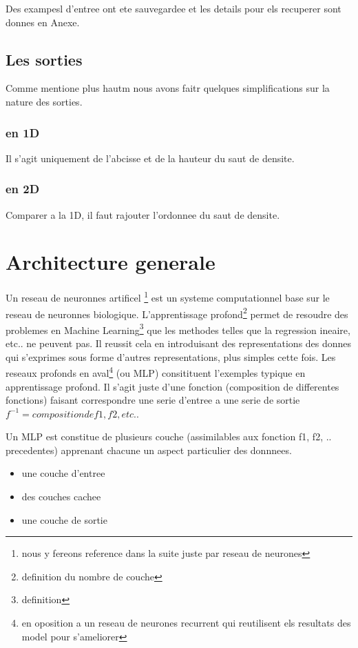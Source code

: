 Des exampesl d'entree ont ete sauvegardee et les details pour els recuperer sont donnes en Anexe.

\subsection{Les sorties}
Comme mentione plus hautm nous avons faitr quelques simplifications sur la nature des sorties.
\subsubsection{en 1D}
Il s'agit uniquement de l'abcisse et de la hauteur du saut de densite.
\subsubsection{en 2D}
Comparer a la 1D, il faut rajouter l'ordonnee du saut de densite.


\section{Architecture generale}

Un reseau de neuronnes artificel \footnote{nous y fereons reference dans la suite juste par reseau de neurones} est un systeme computationnel base sur le reseau de neuronnes biologique. L'apprentissage profond\footnote{definition du nombre de couche} permet de resoudre des problemes en Machine Learning\footnote{definition} que les methodes telles que la regression ineaire, etc.. ne peuvent pas. Il reussit cela en introduisant des representations des donnes qui s'exprimes sous forme d'autres representations, plus simples cette fois. Les reseaux profonds en aval\footnote{en oposition a un reseau de neurones recurrent qui reutilisent els resultats des model pour s'ameliorer} (ou MLP) consitituent l'exemples typique en apprentissage profond. Il s'agit juste d'une fonction (composition de differentes fonctions) faisant correspondre une serie d'entree a une serie de sortie $f^{-1} = composition de f1, f2, etc.$.

Un MLP est constitue de plusieurs couche (assimilables aux fonction f1, f2, .. precedentes) apprenant chacune un aspect particulier des donnnees.
\begin{itemize}
 \item une couche d'entree
 \item des couches cachee
 \item une couche de sortie
\end{itemize}


